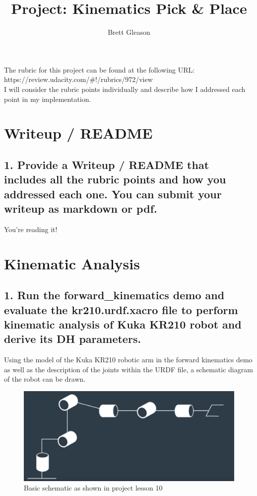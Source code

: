 \documentclass{article}
\begin{document}
\title{Project: Kinematics Pick \& Place}
\author{Brett Gleason}

\maketitle

The rubric for this project can be found at the following URL: \\
https://review.udacity.com/\#!/rubrics/972/view \\
I will consider the rubric points individually and describe how I addressed each point in my implementation.  

\section{Writeup / README}

\subsection{1. Provide a Writeup / README that includes all the rubric points and how you addressed each one.  You can submit your writeup as markdown or pdf.}

You're reading it!

\section{Kinematic Analysis}
\subsection{1. Run the forward\_kinematics demo and evaluate the kr210.urdf.xacro file to perform kinematic analysis of Kuka KR210 robot and derive its DH parameters.}

Using the model of the Kuka KR210 robotic arm in the forward kinematics demo as well as the description of the joints within the URDF file, a schematic diagram of the robot can be drawn.

\begin{figure}[H]
    \includegraphics[width=\linewidth]{KR210scheme.png}
    \caption{Basic schematic as shown in project lesson 10}
    \label{fig:scheme}
\end{figure}
\end{document}
